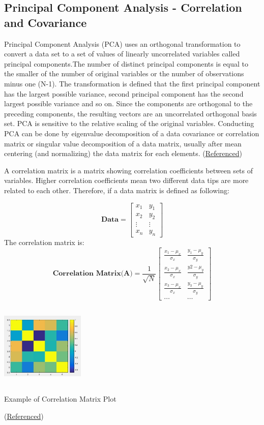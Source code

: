 \documentclass{tufte-handout}
\begin{document}
\subsection{Principal Component Analysis - Correlation and Covariance}
Principal Component Analysis (PCA) uses an orthogonal transformation to convert a data set to a set of values of linearly uncorrelated variables called principal components.The number of distinct principal components is equal to the smaller of the number of original variables or the number of observations minus one (N-1). The transformation is defined that the first principal component has the largest possible variance, second principal component has the second largest possible variance and so on. Since the components are orthogonal to the preceding components, the resulting vectors are an uncorrelated orthogonal basis set. PCA is sensitive to the relative scaling of the original variables. Conducting PCA can be done by eigenvalue decomposition of a data covariance or correlation matrix or singular value decomposition of a data matrix, usually after mean centering (and normalizing) the data matrix for each elements. (\href{https://en.wikipedia.org/wiki/Principal_component_analysis}{Referenced})

A correlation matrix is a matrix showing correlation coefficients between sets of variables. Higher correlation coefficients mean two different data tips are more related to each other. Therefore, if a data matrix is defined as following:

\[
\textbf{Data} = 
\begin{bmatrix}
    x_{1} & y_{1}  \\
    x_{2} & y_{2}  \\
    \vdots & \vdots \\
    x_{n} & y_{n} 
\end{bmatrix}
\]
The correlation matrix is:
\[
\textbf{Correlation Matrix(A)}= 
\frac{1}{\sqrt{N}}
\begin{bmatrix}
    \frac{x_{1}-\mu_{x}}{\sigma_{x}}  & \frac{y_{1}-\mu_{y}}{\sigma_{y}} \\
    \frac{x_{2}-\mu_{x}}{\sigma_{x}} & \frac{y{2}-\mu_{y}}{\sigma_{y}} \\
    \frac{x_{3}-\mu_{x}}{\sigma_{x}} & \frac{y_{3}-\mu_{y}}{\sigma_{y}} \\
    \dots  & \dots
\end{bmatrix}
\]
\begin{marginfigure}
    \centering
    \includegraphics[width = 4cm, height = 4cm]{correlation.jpg}
    \label{fig:corr}
\caption{Example of Correlation Matrix Plot}
(\href{https://www.quora.com/Whats-the-best-way-to-visualize-correlations-between-six-value-vectors}{Referenced})


\end{marginfigure}
\end{document}
